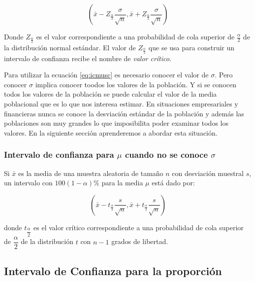 \documentclass[]{book}
\begin{document}
\begin{equation} 
  \left(\bar{x} - Z_{\frac{\alpha}{2}}\dfrac{\sigma}{\sqrt{n}}, \bar{x} + Z_{\frac{\alpha}{2}}\dfrac{\sigma}{\sqrt{n}}  \right)
  \label{eq:icmusc}
\end{equation}

Donde \(Z_{\frac{\alpha}{2}}\) es el valor correspondiente a una probabilidad de cola superior de \(\frac{\alpha}{2}\) de la distribución normal estándar. El valor de \(Z_{\frac{\alpha}{2}}\) que se usa para construir un intervalo de confianza recibe el nombre de \emph{valor crítico}.

Para utilizar la ecuación \eqref{eq:icmusc} es necesario conocer el valor de \(\sigma\). Pero conocer \(\sigma\) implica conocer toodos los valores de la población. Y si se conocen todos los valores de la población se puede calcular el valor de la media poblacional que es lo que nos interesa estimar. En situaciones empresariales y financieras nunca se conoce la desviación estándar de la población y además las poblaciones son muy grandes lo que imposibilita poder examinar todos los valores. En la siguiente sección aprenderemos a abordar esta situación.

\hypertarget{icsd}{%
\subsubsection{\texorpdfstring{Intervalo de confianza para \(\mu\) cuando no se conoce \(\sigma\)}{Intervalo de confianza para \textbackslash{}mu cuando no se conoce \textbackslash{}sigma}}\label{icsd}}

Si \(\bar{x}\) es la media de una muestra aleatoria de tamaño \(n\) con desviación muestral \(s\), un intervalo con \(100\left(1-\alpha\right)\%\) para la media \(\mu\) está dado por:

\begin{equation} 
  \left(\bar{x} - t_{\frac{\alpha}{2}}\dfrac{s}{\sqrt{n}}, \bar{x} + t_{\frac{\alpha}{2}}\dfrac{s}{\sqrt{n}}  \right)
  \label{eq:icmusd}
\end{equation}

donde \(t_{\dfrac{\alpha}{2}}\) es el valor crítico correspondiente a una probabilidad de cola superior de \(\dfrac{\alpha}{2}\) de la distribución \(t\) con \(n-1\) grados de libertad.

\hypertarget{intervalo-de-confianza-para-la-proporcion}{%
\subsection{Intervalo de Confianza para la proporción}\label{intervalo-de-confianza-para-la-proporcion}}
\end{document}
